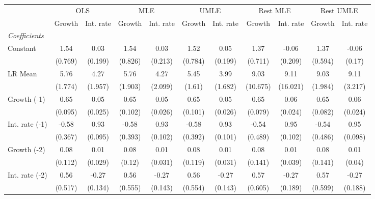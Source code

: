 \begin{table}[htbp] 
	\centering
	\begin{tabular}{@{\extracolsep{4pt}}lcccccccccc@{}}		\hline\hline
		 		 & \multicolumn{2}{c}{OLS} &\multicolumn{2}{c}{MLE} &\multicolumn{2}{c}{UMLE} &\multicolumn{2}{c}{Rest MLE} &\multicolumn{2}{c}{Rest UMLE} \\ 
 		 & Growth 	 & Int. rate 	 & Growth 	 & Int. rate 	 & Growth 	 & Int. rate 	 & Growth 	 & Int. rate 	 & Growth 	 & Int. rate\\\cline{2-3}\cline{4-5}\cline{6-7}\cline{8-9}\cline{10-11}
\rule{0pt}{4ex} 
 \emph{Coefficients} 	  		 & 		 & 		 & 		 & 		 & 		 & 		 & 		 & 		 & 		 &\\ 
\quad Constant 	 & 1.54 	 & 0.03 	 & 1.54 	 & 0.03 	 & 1.52 	 & 0.05 	 & 1.37 	 & -0.06 	 & 1.37 	 & -0.06	 \\ 
 		 & (0.769) 	 & (0.199) 	 & (0.826) 	 & (0.213) 	 & (0.784) 	 & (0.199) 	 & (0.711) 	 & (0.209) 	 & (0.594) 	 & (0.17) 	 \\ 
\quad LR Mean 	 & 5.76 	 & 4.27 	 & 5.76 	 & 4.27 	 & 5.45 	 & 3.99 	 & 9.03 	 & 9.11 	 & 9.03 	 & 9.11	 \\ 
 		 & (1.774) 	 & (1.957) 	 & (1.903) 	 & (2.099) 	 & (1.61) 	 & (1.682) 	 & (10.675) 	 & (16.021) 	 & (1.984) 	 & (3.217) 	 \\ 
\quad Growth (-1) 	 &0.65 	 & 0.05 	 & 0.65 	 & 0.05 	 & 0.65 	 & 0.05 	 & 0.65 	 & 0.06 	 & 0.65 	 & 0.06	 \\ 
 		 & (0.095) 	 & (0.025) 	 & (0.102) 	 & (0.026) 	 & (0.101) 	 & (0.026) 	 & (0.079) 	 & (0.024) 	 & (0.082) 	 & (0.024) 	 \\ 
\quad Int. rate (-1) 	 &-0.58 	 & 0.93 	 & -0.58 	 & 0.93 	 & -0.58 	 & 0.93 	 & -0.54 	 & 0.95 	 & -0.54 	 & 0.95	 \\ 
 		 & (0.367) 	 & (0.095) 	 & (0.393) 	 & (0.102) 	 & (0.392) 	 & (0.101) 	 & (0.489) 	 & (0.102) 	 & (0.486) 	 & (0.098) 	 \\ 
\quad Growth (-2) 	 &0.08 	 & 0.01 	 & 0.08 	 & 0.01 	 & 0.08 	 & 0.01 	 & 0.08 	 & 0.01 	 & 0.08 	 & 0.01	 \\ 
 		 & (0.112) 	 & (0.029) 	 & (0.12) 	 & (0.031) 	 & (0.119) 	 & (0.031) 	 & (0.141) 	 & (0.039) 	 & (0.141) 	 & (0.04) 	 \\ 
\quad Int. rate (-2) 	 &0.56 	 & -0.27 	 & 0.56 	 & -0.27 	 & 0.56 	 & -0.27 	 & 0.57 	 & -0.27 	 & 0.57 	 & -0.27	 \\ 
 		 & (0.517) 	 & (0.134) 	 & (0.555) 	 & (0.143) 	 & (0.554) 	 & (0.143) 	 & (0.605) 	 & (0.189) 	 & (0.599) 	 & (0.188) 	 \\ 

\end{tabular}
\end{table}
